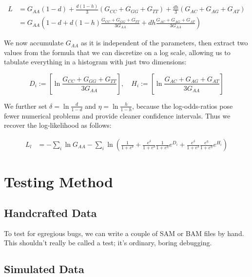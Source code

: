 \documentclass{article}
\begin{document}
\begin{align*}
L &= G_{AA} \left( 1-d \right) + \frac{d(1-h)}{3} \left( G_{CC} + G_{GG} + G_{TT} \right)
          + \frac{dh}{3} \left( G_{AC} + G_{AG} + G_{AT} \right) \\
  &= G_{AA} \left( 1-d + d(1-h) \frac{G_{CC} + G_{GG} + G_{TT}}{3 G_{AA}}
          + dh \frac{G_{AC} + G_{AG} + G_{AT}}{3 G_{AA}} \right)
\end{align*}

We now accumulate $G_{AA}$ as it is independent of the
parameters, then extract two values from the formula that we can
discretize on a log scale, allowing us to tabulate everything in a
histogram with just two dimensions:

\begin{equation*}
D_i := \left[ \ln \frac{G_{CC} + G_{GG} + G_{TT}}{3 G_{AA}} \right], \quad
H_i := \left[ \ln \frac{G_{AC} + G_{AG} + G_{AT}}{3 G_{AA}} \right]
\end{equation*}

We further set $\delta = \ln \frac{d}{1-d}$ and $\eta = \ln
\frac{h}{1-h}$, because the log-odds-ratios pose fewer numerical
problems and provide cleaner confidence intervals.  Thus we recover the
log-likelihood as follows:

\begin{align*}
L_l &= - \sum_{i} \ln G_{AA} - \sum_{i} \ln \left( \frac{1}{1+e^\delta} +
    \frac{e^\delta}{1+e^\delta} \frac{1}{1+e^\eta} e^{D_i} +
    \frac{e^\delta}{1+e^\delta} \frac{e^\eta}{1+e^\eta} e^{H_i} \right)
\end{align*}


\section{Testing Method}

\subsection{Handcrafted Data}

To test for egregious bugs, we can write a couple of SAM or BAM files by
hand.  This shouldn't really be called a test; it's ordinary, boring
debugging.

\subsection{Simulated Data}
\end{document}
